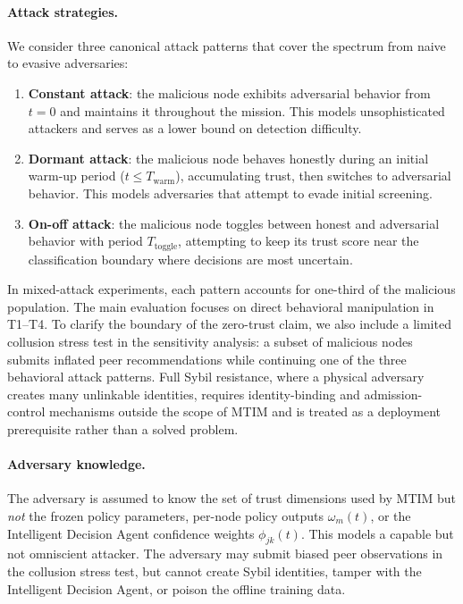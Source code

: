 \documentclass[notspecified,article,submit,moreauthors]{Definitions/mdpi}
\begin{document}
\paragraph{Attack strategies.}
We consider three canonical attack patterns that cover the spectrum from naive to evasive adversaries:
\begin{enumerate}[label={(\roman*)}]
    \item \textbf{Constant attack}: the malicious node exhibits adversarial behavior from $t = 0$ and maintains it throughout the mission. This models unsophisticated attackers and serves as a lower bound on detection difficulty.
    \item \textbf{Dormant attack}: the malicious node behaves honestly during an initial warm-up period ($t \leq T_{\text{warm}}$), accumulating trust, then switches to adversarial behavior. This models adversaries that attempt to evade initial screening.
    \item \textbf{On-off attack}: the malicious node toggles between honest and adversarial behavior with period $T_{\text{toggle}}$, attempting to keep its trust score near the classification boundary where decisions are most uncertain.
\end{enumerate}
In mixed-attack experiments, each pattern accounts for one-third of the malicious population. The main evaluation focuses on direct behavioral manipulation in T1--T4. To clarify the boundary of the zero-trust claim, we also include a limited collusion stress test in the sensitivity analysis: a subset of malicious nodes submits inflated peer recommendations while continuing one of the three behavioral attack patterns. Full Sybil resistance, where a physical adversary creates many unlinkable identities, requires identity-binding and admission-control mechanisms outside the scope of MTIM and is treated as a deployment prerequisite rather than a solved problem.

\paragraph{Adversary knowledge.}
The adversary is assumed to know the set of trust dimensions used by MTIM but \emph{not} the frozen policy parameters, per-node policy outputs $\omega_m(t)$, or the Intelligent Decision Agent confidence weights $\phi_{jk}(t)$. This models a capable but not omniscient attacker. The adversary may submit biased peer observations in the collusion stress test, but cannot create Sybil identities, tamper with the Intelligent Decision Agent, or poison the offline training data.
\end{document}
